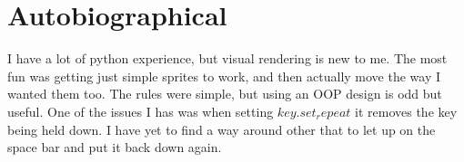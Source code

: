 \documentclass{article}
\begin{document}
\section{Autobiographical}
I have a lot of python experience, but visual rendering is new to me. The most fun was getting just simple sprites to work, and then actually move the way I wanted them too. The rules were simple, but using an OOP design is odd but useful.
One of the issues I has was when setting $key.set_repeat$ it removes the key being held down. I have yet to find a way around other that to let up on the space bar and put it back down again.
\end{document}
